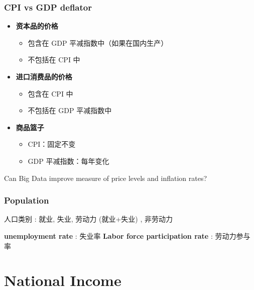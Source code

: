 \subsection{CPI vs GDP deflator}
\begin{itemize}
    \item \textbf{资本品的价格}
    \begin{itemize}
        \item 包含在 GDP 平减指数中（如果在国内生产）
        \item 不包括在 CPI 中
    \end{itemize}

    \item \textbf{进口消费品的价格}
    
\begin{itemize}
        \item 包含在 CPI 中
        \item 不包括在 GDP 平减指数中
    \end{itemize}

    \item \textbf{商品篮子}
    
\begin{itemize}
        \item CPI：固定不变
        \item GDP 平减指数：每年变化
    \end{itemize}
\end{itemize}

\begin{problem}
    Can Big Data improve measure of price levels and inflation rates?
\end{problem}
\subsection{Population}
\begin{note}
    人口类别 : 就业, 失业, 劳动力 (就业+失业) , 非劳动力
\end{note}
\begin{definition}
    \textbf{unemployment rate} : 失业率
    \textbf{Labor force participation rate} : 劳动力参与率
\end{definition}

\chapter{National Income}

